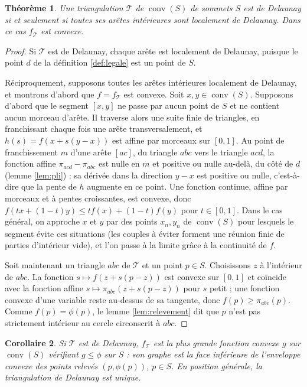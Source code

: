 \documentclass[11pt,a4paper]{article}
\theoremstyle{plain}
\newtheorem{theoreme}{Théorème}[section]
\newtheorem{corollaire}[theoreme]{Corollaire}
\theoremstyle{definition}
\theoremstyle{remark}
\DeclareMathOperator{\conv}{conv}
\begin{document}
\begin{theoreme}\label{thm:local-global}
Une triangulation $\mathcal T$ de $\conv(S)$ de sommets $S$ est de Delaunay si et seulement si toutes ses arêtes intérieures sont localement de Delaunay. Dans ce cas $f_{\mathcal T}$ est convexe.
\end{theoreme}

\begin{proof}
Si $\mathcal T$ est de Delaunay, chaque arête est localement de Delaunay, puisque le point $d$ de la définition \ref{def:legale} est un point de $S$.

Réciproquement, supposons toutes les arêtes intérieures localement de Delaunay, et montrons d'abord que $f=f_{\mathcal T}$ est convexe. Soit $x,y\in\conv(S)$. Supposons d'abord que le segment $[x,y]$ ne passe par aucun point de $S$ et ne contient aucun morceau d'arête. Il traverse alors une suite finie de triangles, en franchissant chaque fois une arête transversalement, et $h(s)=f(x+s(y-x))$ est affine par morceaux sur $[0,1]$. Au point de franchissement $m$ d'une arête $[ac]$, du triangle $abc$ vers le triangle $acd$, la fonction affine $\pi_{acd}-\pi_{abc}$ est nulle en $m$ et positive ou nulle au-delà, du côté de $d$ (lemme \ref{lem:pli}) : sa dérivée dans la direction $y-x$ est positive ou nulle, c'est-à-dire que la pente de $h$ augmente en ce point. Une fonction continue, affine par morceaux et à pentes croissantes, est convexe, donc $f(tx+(1-t)y)\leq tf(x)+(1-t)f(y)$ pour $t\in[0,1]$. Dans le cas général, on approche $x$ et $y$ par des points $x_n,y_n$ de $\conv(S)$ pour lesquels le segment évite ces situations (les couples à éviter forment une réunion finie de parties d'intérieur vide), et l'on passe à la limite grâce à la continuité de $f$.

Soit maintenant un triangle $abc$ de $\mathcal T$ et un point $p\in S$. Choisissons $z$ à l'intérieur de $abc$. La fonction $s\mapsto f(z+s(p-z))$ est convexe sur $[0,1]$ et coïncide avec la fonction affine $s\mapsto\pi_{abc}(z+s(p-z))$ pour $s$ petit ; une fonction convexe d'une variable reste au-dessus de sa tangente, donc $f(p)\geq\pi_{abc}(p)$. Comme $f(p)=\phi(p)$, le lemme \ref{lem:relevement} dit que $p$ n'est pas strictement intérieur au cercle circonscrit à $abc$.
\end{proof}

\begin{corollaire}\label{cor:enveloppe}
Si $\mathcal T$ est de Delaunay, $f_{\mathcal T}$ est la plus grande fonction convexe $g$ sur $\conv(S)$ vérifiant $g\leq\phi$ sur $S$ : son graphe est la face inférieure de l'enveloppe convexe des points relevés $(p,\phi(p))$, $p\in S$. En position générale, la triangulation de Delaunay est unique.
\end{corollaire}
\end{document}
